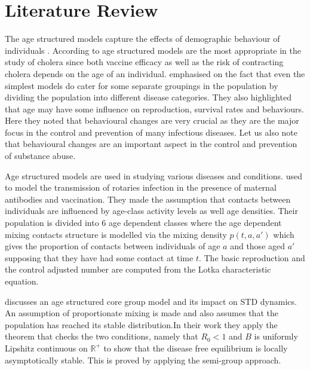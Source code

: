 \chapter{Literature Review}

The age structured models capture the effects of demographic behaviour of individuals \cite{liu2015stability}. According to \cite{alexanderian2011age} age structured models are the most appropriate in the study of cholera since both vaccine efficacy as well as the risk of contracting cholera depends on the age of an individual. \cite{li2008continuous} emphasised on the fact that even the simplest models do cater for  some separate groupings in the population by dividing the population into different disease categories. They also highlighted that age may have some influence on reproduction, survival rates and behaviours. Here they noted that behavioural changes are very crucial as they are the major focus in the control and prevention of many infectious diseases. Let us also note that behavioural  changes are  an important aspect in the control and prevention of substance abuse.

Age structured models are used in studying various diseases and conditions. \cite{shim2006age} used to model the transmission of rotaries infection in the presence of maternal antibodies and vaccination. They made the  assumption that contacts between individuals are influenced by age-class activity levels as well age densities. Their population is divided into 6 age dependent classes where the age dependent mixing contacts structure is modelled via the mixing density $p(t,a,a')$ which gives the proportion of contacts between individuals of age $a$ and those aged $a'$ supposing that they have had some contact at time $t$. The basic reproduction and the control adjusted number are computed from the Lotka characteristic equation.


\cite{castillo2002age} discusses an age structured core group model and its impact on STD dynamics. An assumption of proportionate mixing is made and also assumes that the population has reached its stable distribution.In their work they apply the theorem that checks the two conditions, namely that $R_0 <1$ and $B$ is uniformly Lipshitz continuous on $\mathbb{R}^+$ to show that the disease free equilibrium is locally asymptotically stable. This is proved by applying the semi-group approach.
